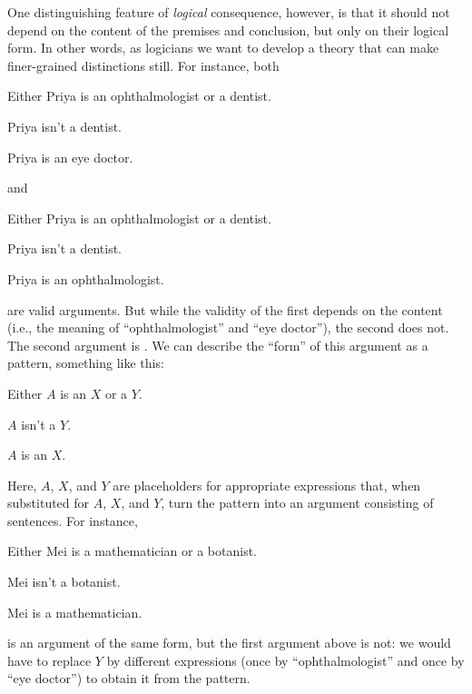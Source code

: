 One distinguishing feature of \emph{logical} consequence, however, is that it should not depend on the content of the premises and conclusion, but only on their logical form. In other words, as logicians we want to develop a theory that can make finer-grained distinctions still. For instance, both
\begin{earg}
	\item[] Either Priya is an ophthalmologist or a dentist.
	\item[] Priya isn't a dentist.
	\item[\therefore] Priya is an eye doctor.
\end{earg}
and
\begin{earg}
	\item[] Either Priya is an ophthalmologist or a dentist.
	\item[] Priya isn't a dentist.
	\item[\therefore] Priya is an ophthalmologist.
\end{earg}
are valid arguments. But while the validity of the first depends on the content (i.e., the meaning of ``ophthalmologist'' and ``eye doctor''), the second does not. The second argument is . We can describe the ``form'' of this argument as a pattern, something like this:
\begin{earg}
	\item[] Either $A$ is an $X$ or a $Y$.
	\item[] $A$ isn't a $Y$.
	\item[\therefore] $A$ is an $X$.
\end{earg}
Here, $A$, $X$, and $Y$ are placeholders for appropriate expressions that, when substituted for $A$, $X$, and $Y$, turn the pattern into an argument consisting of sentences. For instance,
\begin{earg}
	\item[] Either Mei is a mathematician or a botanist.
	\item[] Mei isn't a botanist.
	\item[\therefore] Mei is a mathematician.
\end{earg}
is an argument of the same form, but the first argument above is not: we would have to replace $Y$ by different expressions (once by ``ophthalmologist'' and once by ``eye doctor'') to obtain it from the pattern.

